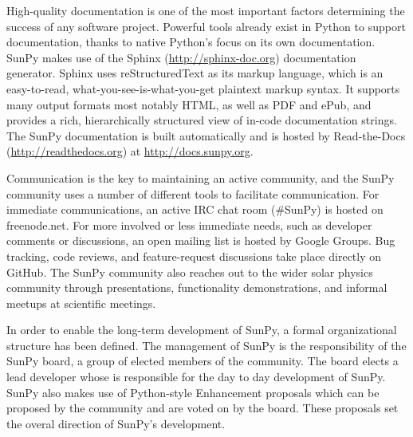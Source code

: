 High-quality documentation is
one of the most important factors determining the success of any software project. 
Powerful tools already exist in Python to support documentation, thanks to native
Python's focus on its own documentation. SunPy makes use of the Sphinx (\url{http://sphinx-doc.org})
documentation generator. Sphinx uses reStructuredText as its markup language, which is
an easy-to-read, what-you-see-is-what-you-get plaintext markup syntax. It supports
many output formats most notably HTML, as well as PDF and ePub, and provides a rich,
hierarchically structured view of in-code documentation strings. The SunPy documentation 
is built automatically and is hosted by Read-the-Docs (\url{http://readthedocs.org})
at \url{http://docs.sunpy.org}. 

Communication is the key to maintaining an active community, and the SunPy community 
uses a number of different tools to facilitate communication. For immediate communications, an active IRC chat
room (\#SunPy) is hosted on freenode.net. For more involved or less immediate needs, such as
developer comments or discussions, an open mailing list is hosted by Google Groups. 
Bug tracking, code reviews, and feature-request discussions take place directly on GitHub.
The SunPy community also reaches out to the wider solar physics
community through presentations, functionality demonstrations, and informal meetups at scientific
meetings. 

In order to enable the long-term development of SunPy, a formal organizational
structure has been defined. The management of SunPy is the responsibility of 
the SunPy board, a group of elected members of the community. The board elects
a lead developer whose is responsible for the day to day development of SunPy.
SunPy also makes use of Python-style Enhancement proposals which can be proposed
by the community and are voted on by the board. These proposals set the overal
direction of SunPy's development.
